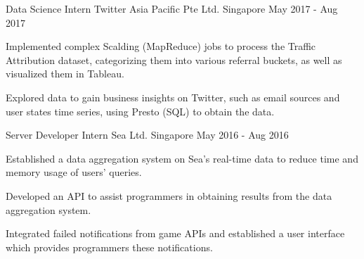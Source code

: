 

\begin{cventries}

	\cventry
	{Data Science Intern} %
	{Twitter Asia Pacific Pte Ltd.} %
	{Singapore} %
	{May 2017 - Aug 2017} %
	{
		\begin{cvitems} %
		\item {Implemented complex Scalding (MapReduce) jobs to process the Traffic Attribution dataset, categorizing them into various referral buckets, as well as visualized them in Tableau.}
		\item {Explored data to gain business insights on Twitter, such as email sources and user states time series, using Presto (SQL) to obtain the data.}
		\end{cvitems}
	}

	\cventry
	{Server Developer Intern} %
	{Sea Ltd.} %
	{Singapore} %
	{May 2016 - Aug 2016} %
	{
		\begin{cvitems} %
		\item {Established a data aggregation system on Sea's real-time data to reduce time and memory usage of users' queries.}
		\item {Developed an API to assist programmers in obtaining results from the data aggregation system.}
		\item {Integrated failed notifications from game APIs and established a user interface which provides programmers these notifications.}
		\end{cvitems}
	}

\end{cventries}
